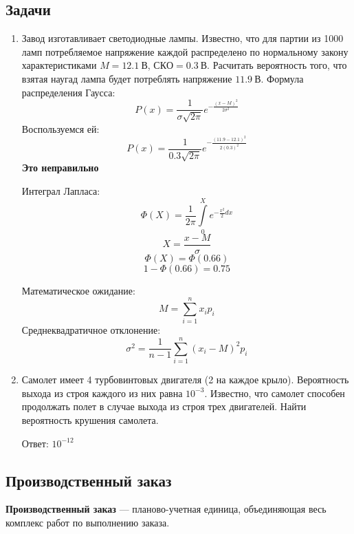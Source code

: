 \subsection{Задачи}
\begin{enumerate}
  \item Завод изготавливает светодиодные лампы. Известно, что для партии из 1000
    ламп потребляемое напряжение каждой распределено по нормальному закону
    характеристиками $M = 12.1\ В$, $СКО = 0.3\ В$. Расчитать вероятность того,
    что взятая наугад лампа будет потреблять напряжение $11.9\ В$.
    Формула распределения Гаусса:
    \begin{equation}
      P(x) = \frac{1}{\sigma \sqrt{2 \pi}} e^{- \frac{(x-M)^2}{2 \sigma^2}}
    \end{equation}
    Воспользуемся ей:
    \[
      P(x) = \frac{1}{0.3 \sqrt{2 \pi}} e^{- \frac{(11.9 - 12.1)^2}{2 (0.3)^2}}
    \] 
    \textbf{Это неправильно}\par
    Интеграл Лапласа:
    \begin{equation}
      \Phi(X) = \frac{1}{2\pi} \int\limits _0 ^X e^{-\frac{x^2}{2} dx}
    \end{equation} 
    \[
      X = \frac{x - M}{\sigma}
    \] 
    \[
      \Phi(X) = \Phi(0.66)
    \] 
    \[
      1 - \Phi(0.66) = 0.75
    \] 

    Математическое ожидание:
    \begin{equation}
      M = \sum_{i = 1} ^{n} x_i p_i
    \end{equation}
    Среднеквадратичное отклонение:
    \begin{equation}
      \sigma ^2 = \frac{1}{n - 1} \sum _{i=1} ^{n} (x_i - M)^2 p_i
    \end{equation} 

  \item Самолет имеет 4 турбовинтовых двигателя (2 на каждое крыло). Вероятность
    выхода из строя каждого из них равна $10^{-3}$. Известно, что самолет
    способен продолжать полет в случае выхода из строя трех двигателей. Найти
    вероятность крушения самолета.
    
    Ответ: $10^{-12}$

\end{enumerate}

\subsection{Производственный заказ}
\textbf{Производственный заказ} --- планово-учетная единица, объединяющая весь
комплекс работ по выполнению заказа.

